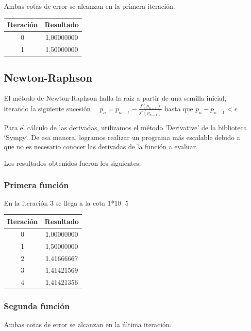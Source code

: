 \documentclass[titlepage,a4paper]{article}
\begin{document}
Ambas cotas de error se alcanzan en la primera iteración.

\begin{center}
    \begin{tabular}{| c | c |}
    \hline
     Iteración & Resultado \\ \hline
        0     & 1,00000000 \\
        1     & 1,50000000 \\
    \hline
    \end{tabular}
\end{center}
\subsection{Newton-Raphson}\label{sec:NewtonRaphson}
El método de Newton-Raphson halla la raíz a partir de una semilla inicial, iterando la siguiente sucesión
$\quad p_{n} =p_{n-1}-\frac{f (p_{n-1})}{f'(p_{n-1})}$ hasta que 
$p_{n}-p_{n-1} < \mbox{$\epsilon$}$


Para el cálculo de las derivadas, utilizamos el método 'Derivative' de la biblioteca `Sympy`. De esa manera, logramos realizar un programa más escalable debido a que no es necesario conocer las derivadas de la función a evaluar.

Los resultados obtenidos fueron los siguientes:

\subsubsection{Primera función}\label{sec:NR1}
En la iteración 3 se llega a la cota 1*10$^-5$
\begin{center}
    \begin{tabular}{| c | c |}
    \hline
     Iteración & Resultado \\ \hline
        0     & 1,00000000 \\
        1     & 1,50000000 \\
        2     & 1,41666667 \\
        3     & 1,41421569 \\
        4     & 1,41421356 \\
    \hline
    \end{tabular}
\end{center}
\subsubsection{Segunda función}\label{sec:NR2}
Ambas cotas de error se alcanzan en la última iteración.
\end{document}
